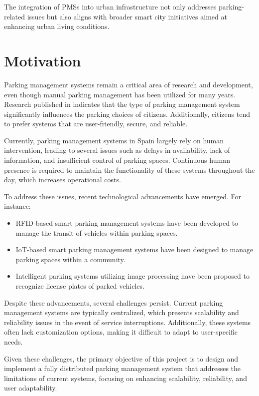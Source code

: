 \documentclass[oneside, 12pt, a4paper, draft]{book}
\begin{document}
The integration of PMSs into urban infrastructure not only addresses parking-related issues but also aligns with broader smart city initiatives aimed at enhancing urban living conditions.
\chapter{Motivation}
\label{sec:org1fd61c1}
Parking management systems remain a critical area of research and development, even though manual parking management has been utilized for many years. Research published in \autocite{parking_choices} indicates that the type of parking management system significantly influences the parking choices of citizens. Additionally, citizens tend to prefer systems that are user-friendly, secure, and reliable.

Currently, parking management systems in Spain largely rely on human intervention, leading to several issues such as delays in availability, lack of information, and insufficient control of parking spaces. Continuous human presence is required to maintain the functionality of these systems throughout the day, which increases operational costs.

To address these issues, recent technological advancements have emerged. For instance:
\begin{itemize}
\item RFID-based smart parking management systems \autocite{rfid_smart_parking_management_system} have been developed to manage the transit of vehicles within parking spaces.
\item IoT-based smart parking management systems \autocite{development_smart_parking_management_system} have been designed to manage parking spaces within a community.
\item Intelligent parking systems utilizing image processing \autocite{intelligent_parking_system_image_processing} have been proposed to recognize license plates of parked vehicles.
\end{itemize}

Despite these advancements, several challenges persist. Current parking management systems are typically centralized, which presents scalability and reliability issues in the event of service interruptions. Additionally, these systems often lack customization options, making it difficult to adapt to user-specific needs.

Given these challenges, the primary objective of this project is to design and implement a fully distributed parking management system that addresses the limitations of current systems, focusing on enhancing scalability, reliability, and user adaptability.
\end{document}
